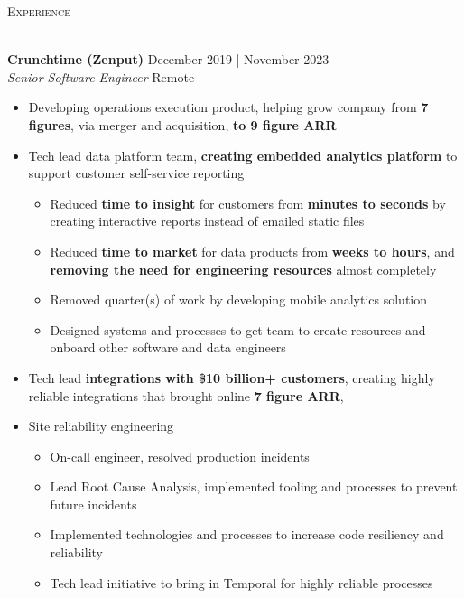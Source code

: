 \documentclass[a4paper]{article}
\newcommand{\lineunder} {
    \vspace*{-8pt} \\
    \hspace*{-18pt} {\color{Mahogany} \hrulefill} \\
}
\newcommand{\header} [1] {
    \vspace{4mm}
    {\hspace*{-18pt}\vspace*{6pt} \large \textsc{\textcolor{Mahogany}{#1}}}
    \vspace*{-6pt} \lineunder
}
\newenvironment{jobdetails}%
    {\list{}{\leftmargin=4mm}\item[]}%
    {\endlist}
\begin{document}
\header{Experience}
\vspace{1mm}

\textbf{Crunchtime (Zenput)} \hfill December 2019 | November 2023 \\
\textit{Senior Software Engineer} \hfill Remote \\
\vspace{2mm}

\begin{jobdetails}
\begin{itemize} \itemsep 1pt
    \item Developing operations execution product, helping grow company from \textbf{7 figures}, via merger and acquisition, \textbf{to 9 figure ARR}
    \item Tech lead data platform team, \textbf{creating embedded analytics platform} to support customer self-service reporting
        \begin{itemize}
            \item Reduced \textbf{time to insight} for customers from \textbf{minutes to seconds} by creating interactive reports instead of emailed static files
            \item Reduced \textbf{time to market} for data products from \textbf{weeks to hours}, and \textbf{removing the need for engineering resources} almost completely
            \item Removed quarter(s) of work by developing mobile analytics solution
            \item Designed systems and processes to get team to create resources and onboard other software and data engineers
        \end{itemize}
    \item Tech lead \textbf{integrations with \$10 billion+ customers}, creating highly reliable integrations that brought online \textbf{7 figure ARR},
    \item Site reliability engineering
        \begin{itemize}
            \item On-call engineer, resolved production incidents
            \item Lead Root Cause Analysis, implemented tooling and processes to prevent future incidents
            \item Implemented technologies and processes to increase code resiliency and reliability
            \item Tech lead initiative to bring in Temporal for highly reliable processes

\end{itemize}
\end{itemize}
\end{jobdetails}
\end{document}
